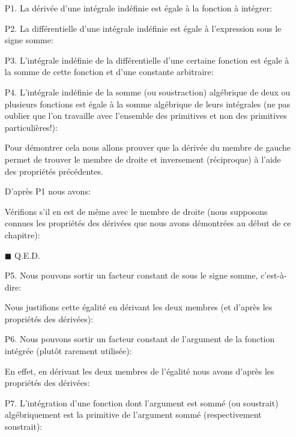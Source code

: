 	\begin{enumerate}
		\item[P1.] La dérivée d'une intégrale indéfinie est égale à la fonction à intégrer:
		
		
		\item[P2.] La différentielle d'une intégrale indéfinie est égale à l'expression sous le signe somme:
		
		
		\item[P3.] L'intégrale indéfinie de la différentielle d'une certaine fonction est égale à la somme de cette fonction et d'une constante arbitraire:
		
		
		\item[P4.] L'intégrale indéfinie de la somme (ou soustraction) algébrique de deux ou plusieurs fonctions est égale à la somme algébrique de leurs intégrales (ne pas oublier que l'on travaille avec l'ensemble des primitives et non des primitives particulières!):
		
		\begin{dem}
		Pour démontrer cela nous allons prouver que la dérivée du membre de gauche permet de trouver le membre de droite et inversement (réciproque) à l'aide des propriétés précédentes.
		
		D'après P1 nous avons:
				
		Vérifions s'il en est de même avec le membre de droite (nous supposons connues les propriétés des dérivées que nous avons démontrées au début de ce chapitre):
		
		\end{dem} 
		\begin{flushright}
			$\blacksquare$  Q.E.D.
		\end{flushright}
		
		\item [P5.] Nous pouvons sortir un facteur constant de sous le signe somme, c'est-à-dire:
		
		Nous justifions cette égalité en dérivant les deux membres (et d'après les propriétés des dérivées):
		
		
		\item[P6.] Nous pouvons sortir un facteur constant de l'argument de la fonction intégrée (plutôt rarement utilisée):
		
		En effet, en dérivant les deux membres de l'égalité nous avons d'après les propriétés des dérivées:
		
		
		\item[P7.] L'intégration d'une fonction dont l'argument est sommé (ou soustrait) algébriquement est la primitive de l'argument sommé (respectivement soustrait):
		

\end{enumerate}
